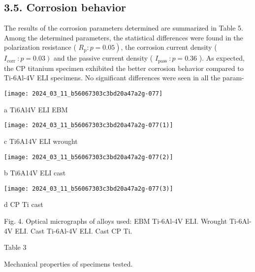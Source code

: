 \documentclass[10pt]{article}
\begin{document}
\subsection*{3.5. Corrosion behavior}
The results of the corrosion parameters determined are summarized in Table 5. Among the determined parameters, the statistical differences were found in the polarization resistance ( $\left.R_{\mathrm{p}}: p=0.05\right)$, the corrosion current density ( $\left.I_{\text {corr }}: p=0.03\right)$ and the passive current density ( $I_{\text {pass }}: p=0.36$ ). As expected, the $\mathrm{CP}$ titanium specimen exhibited the better corrosion behavior compared to Ti-6Al-4V ELI specimens. No significant differences were seen in all the param-

\begin{center}
\texttt{[image: 2024\_03\_11\_b56067303c3bd20a47a2g-077]}
\end{center}

a Ti6Al4V ELI EBM

\begin{center}
\texttt{[image: 2024\_03\_11\_b56067303c3bd20a47a2g-077(1)]}
\end{center}

c Ti6A14V ELI wrought

\begin{center}
\texttt{[image: 2024\_03\_11\_b56067303c3bd20a47a2g-077(2)]}
\end{center}

b Ti6A14V ELI cast

\begin{center}
\texttt{[image: 2024\_03\_11\_b56067303c3bd20a47a2g-077(3)]}
\end{center}

d CP Ti cast

Fig. 4. Optical micrographs of alloys used: EBM Ti-6Al-4V ELI. Wrought Ti-6Al-4V ELI. Cast Ti-6Al-4V ELI. Cast CP Ti.

Table 3

Mechanical properties of specimens tested.
\end{document}
